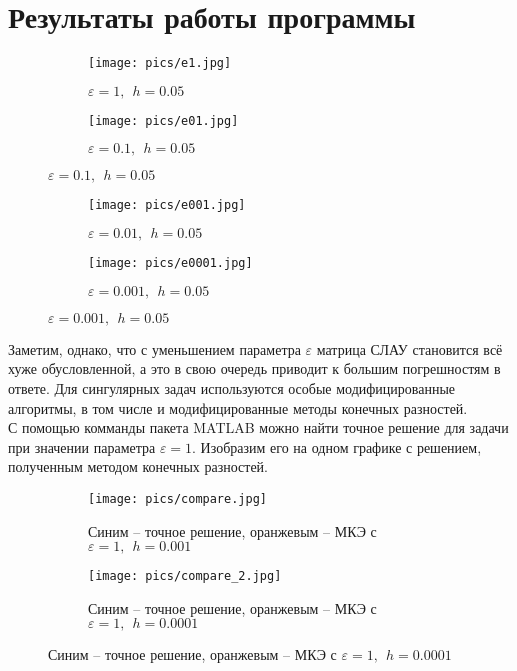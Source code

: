 \documentclass[a4paper,12pt]{extarticle}
\begin{document}
    \section{Результаты работы программы}
   
    \begin{figure}[H]
    \begin{subfigure}{0.5\textwidth}
    \texttt{[image: pics/e1.jpg]} 
    \caption{$\varepsilon=1, ~~ h = 0.05$}
    \label{fig:subim1}
    \end{subfigure}
    \begin{subfigure}{0.5\textwidth}
    \texttt{[image: pics/e01.jpg]} 
    \caption{$\varepsilon=0.1, ~~ h = 0.05$}
    \label{fig:subim1}
    \end{subfigure}
    \end{figure}
    
    \begin{figure}[H]
    \ContinuedFloat
    \begin{subfigure}{0.5\textwidth}
    \texttt{[image: pics/e001.jpg]} 
    \caption{$\varepsilon=0.01, ~~ h = 0.05$}
    \label{fig:subim1}
    \end{subfigure}
    \begin{subfigure}{0.5\textwidth}
    \texttt{[image: pics/e0001.jpg]} 
    \caption{$\varepsilon=0.001, ~~ h = 0.05$}
    \label{fig:subim1}
    \end{subfigure}
    
    \end{figure}
    
    Заметим, однако, что с уменьшением параметра $\varepsilon$ матрица
    СЛАУ становится всё хуже обусловленной, а это в свою очередь приводит
    к большим погрешностям в ответе. Для сингулярных задач используются
    особые модифицированные алгоритмы, в том числе и модифицированные
    методы конечных разностей.\\
    С помощью комманды  пакета MATLAB можно найти точное
    решение для задачи при значении параметра $\varepsilon = 1$.
    Изобразим его на одном графике с решением, полученным методом
    конечных разностей.

    \begin{figure}[H]
    \begin{subfigure}{0.5\textwidth}
    \texttt{[image: pics/compare.jpg]} 
    \caption{Синим -- точное решение, оранжевым -- МКЭ с $\varepsilon=1, ~~ h = 0.001 $}
    \label{fig}
    \end{subfigure}
    \begin{subfigure}{0.5\textwidth}
    \texttt{[image: pics/compare\_2.jpg]} 
    \caption{Синим -- точное решение, оранжевым -- МКЭ с $\varepsilon=1, ~~ h = 0.0001 $}
    \label{fig}
    \end{subfigure}
    \end{figure}
    
\end{document}
